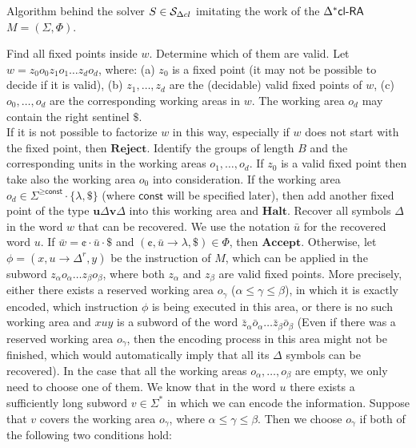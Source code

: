 \begin{algorithm}
\caption{Algorithm behind the solver $S \in \mathcal{S}_{\Delta cl}$ imitating the work of the $\textup{\sf $\Delta^*$cl-RA\/}$ $M = (\Sigma, \Phi)$.}
\label{algorithm:dxclra_solver}
\DontPrintSemicolon
\LinesNumbered
{}
Find all fixed points inside $w$. Determine which of them are valid.\label{algorithm:dxclra_solver:step_1}\;
Let $w = z_0 o_0 z_1 o_1 \ldots z_d o_d$, where:\label{algorithm:dxclra_solver:step_2}\;
\nonl (a) $z_0$ is a fixed point (it may not be possible to decide if
it is valid),\;
\nonl (b) $z_1, \ldots, z_d$ are the (decidable) valid fixed points of $w$,\;
\nonl (c) $o_0, \ldots, o_d$ are the corresponding working areas in $w$.\;
\nonl The working area $o_d$ may contain the right sentinel $\$$.\\
\nonl If it is not possible to factorize $w$ in this way, especially if $w$ does not start with the fixed point, then $\textbf{Reject}$.\;
Identify the groups of length $B$ and the corresponding units in the working areas $o_1, \ldots, o_d$. If $z_0$ is a valid fixed point then take also the working area $o_0$ into consideration.\label{algorithm:dxclra_solver:step_3}\;
If the working area $o_d \in \Sigma^{\ge \textsf{const}} \cdot \{\lambda, \$\}$ (where $\textsf{const}$ will be specified later), then add another fixed point of the type $\mathbf{u} \Delta \mathbf{v} \Delta$ into this working area and $\textbf{Halt}$.\label{algorithm:dxclra_solver:step_4}\;
Recover all symbols $\Delta$ in the word $w$ that can be recovered. We use the notation $\bar{u}$ for the recovered word $u$.\label{algorithm:dxclra_solver:step_5}\;
If $\bar{w} = \cent \cdot \bar{u} \cdot \$$ and $(\cent, \bar{u} \to \lambda, \$) \in \Phi$, then $\textbf{Accept}$.\label{algorithm:dxclra_solver:step_6}\;
Otherwise, let $\phi = (x, u \to \Delta^r, y)$ be the instruction of $M$, which can be applied in the subword $z_{\alpha} o_{\alpha} \ldots z_{\beta} o_{\beta}$, where both $z_{\alpha}$ and $z_{\beta}$ are valid fixed points. More precisely, either there exists a reserved working area $o_{\gamma}$ ($\alpha \le \gamma \le \beta$), in which it is exactly encoded, which instruction $\phi$ is being executed in this area, or there is no such working area and $xuy$ is a subword of the word $\bar{z}_{\alpha} \bar{o}_{\alpha} \ldots \bar{z}_{\beta} \bar{o}_{\beta}$ (Even if there was a reserved working area $o_{\gamma}$, then the encoding process in this area might not be finished, which would automatically imply that all its $\Delta$ symbols can be recovered). In the case that all the working areas $o_{\alpha}, \ldots, o_{\beta}$ are empty, we only need to choose one of them. We know that in the word $u$ there exists a sufficiently long subword $v \in \Sigma^*$ in which we can encode the information. Suppose that $v$ covers the working area $o_{\gamma}$, where $\alpha \le \gamma \le \beta$. Then we choose $o_{\gamma}$ if both of the following two conditions hold:\\

\end{algorithm}
